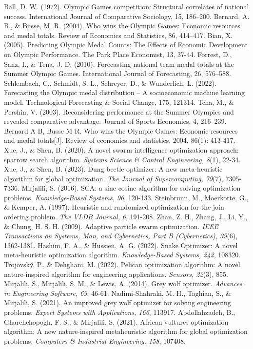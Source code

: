 \documentclass{mcmthesis}
\begin{document}
\begin{thebibliography}{99}
    
     Ball, D. W. (1972). Olympic Games competition: Structural correlates of national success. International Journal of Comparative Sociology, 15, 186–200.
     Bernard, A. B., \& Busse, M. R. (2004). Who wins the Olympic Games: Economic resources and medal totals. Review of Economics and Statistics, 86, 414–417.
     Bian, X. (2005). Predicting Olympic Medal Counts: The Effects of Economic Development on Olympic Performance. The Park Place Economist, 13, 37-44.
     Forrest, D., Sanz, I., \& Tena, J. D. (2010). Forecasting national team medal totals at the Summer Olympic Games. International Journal of Forecasting, 26, 576–588.
     Schlembach, C., Schmidt, S. L., Schreyer, D., \& Wunderlich, L. (2022). Forecasting the Olympic medal distribution – A socioeconomic machine learning model. Technological Forecasting \& Social Change, 175, 121314.
     Tcha, M., \& Pershin, V. (2003). Reconsidering performance at the Summer Olympics and revealed comparative advantage. Journal of Sports Economics, 4, 216–239.
     Bernard A B, Busse M R. Who wins the Olympic Games: Economic resources and medal totals[J]. Review of economics and statistics, 2004, 86(1): 413-417.
     Xue, J., \& Shen, B. (2020). A novel swarm intelligence optimization approach: sparrow search algorithm. \textit{Systems Science \& Control Engineering, 8}(1), 22-34.
     Xue, J., \& Shen, B. (2023). Dung beetle optimizer: A new meta-heuristic algorithm for global optimization. \textit{The Journal of Supercomputing, 79}(7), 7305-7336.
     Mirjalili, S. (2016). SCA: a sine cosine algorithm for solving optimization problems. \textit{Knowledge-Based Systems, 96}, 120-133.
     Steinbrunn, M., Moerkotte, G., \& Kemper, A. (1997). Heuristic and randomized optimization for the join ordering problem. \textit{The VLDB Journal, 6}, 191-208.
     Zhan, Z. H., Zhang, J., Li, Y., \& Chung, H. S. H. (2009). Adaptive particle swarm optimization. \textit{IEEE Transactions on Systems, Man, and Cybernetics, Part B (Cybernetics), 39}(6), 1362-1381.
     Hashim, F. A., \& Hussien, A. G. (2022). Snake Optimizer: A novel meta-heuristic optimization algorithm. \textit{Knowledge-Based Systems, 242}, 108320.
     Trojovský, P., \& Dehghani, M. (2022). Pelican optimization algorithm: A novel nature-inspired algorithm for engineering applications. \textit{Sensors, 22}(3), 855.
     Mirjalili, S., Mirjalili, S. M., \& Lewis, A. (2014). Grey wolf optimizer. \textit{Advances in Engineering Software, 69}, 46-61.
     Nadimi-Shahraki, M. H., Taghian, S., \& Mirjalili, S. (2021). An improved grey wolf optimizer for solving engineering problems. \textit{Expert Systems with Applications, 166}, 113917.
     Abdollahzadeh, B., Gharehchopogh, F. S., \& Mirjalili, S. (2021). African vultures optimization algorithm: A new nature-inspired metaheuristic algorithm for global optimization problems. \textit{Computers \& Industrial Engineering, 158}, 107408.



\end{thebibliography}
\end{document}
